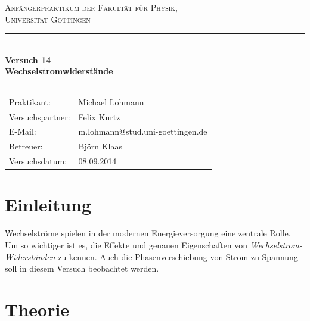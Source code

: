 \documentclass[12pt,a4paper,titlepage,headinclude,bibtotoc]{scrartcl}
\begin{document}
\begin{titlepage}
\centering
\textsc{\Large Anfängerpraktikum der Fakultät für
  Physik,\\[1.5ex] Universität Göttingen}

\vspace*{4.2cm}

\rule{\textwidth}{1pt}\\[0.5cm]
{\huge \bfseries
Versuch 14\\[1.5ex]
  Wechselstromwiderstände
  }\\[0.5cm]
\rule{\textwidth}{1pt}

\vspace*{2.5cm}

\begin{Large}
\begin{tabular}{ll}
Praktikant: &  Michael Lohmann\\
 Versuchspartner: &  Felix Kurtz\\
 E-Mail: & m.lohmann@stud.uni-goettingen.de\\
 Betreuer: & Björn Klaas\\
 Versuchsdatum: & 08.09.2014\\
\end{tabular}
\end{Large}

\vspace*{0.8cm}

\begin{Large}
\end{Large}

\end{titlepage}

\tableofcontents

\newpage

\section{Einleitung}
\label{sec:einleitung}
Wechselströme spielen in der modernen Energieversorgung eine zentrale Rolle.
Um so wichtiger ist es, die Effekte und genauen Eigenschaften von \emph{Wechselstrom-Widerständen} zu kennen.
Auch die Phasenverschiebung von Strom zu Spannung soll in diesem Versuch beobachtet werden.
\section{Theorie}
\label{sec:theorie}
\end{document}
